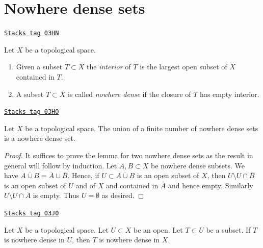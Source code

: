 \section{Nowhere dense sets}
\label{topology-section-nowhere-dense}
\begin{definition}
\label{topology-definition-nowhere-dense}
\href{https://stacks.math.columbia.edu/tag/03HN}{\texttt{Stacks tag 03HN}}

Let $X$ be a topological space.
\begin{enumerate}
\item Given a subset $T \subset X$ the {\it interior} of $T$ is the
largest open subset of $X$ contained in $T$.
\item A subset $T \subset X$ is called {\it nowhere dense} if the closure of
$T$ has empty interior.
\end{enumerate}
\end{definition}

\begin{lemma}
\label{topology-lemma-nowhere-dense}
\href{https://stacks.math.columbia.edu/tag/03HO}{\texttt{Stacks tag 03HO}}

Let $X$ be a topological space. The union of a finite number of nowhere
dense sets is a nowhere dense set.
\end{lemma}

\begin{proof}
It suffices to prove the lemma for two nowhere dense sets as the result in
general will follow by induction. Let $A,B \subset X$ be nowhere dense subsets.
We have $\overline{A \cup B} = \overline{A} \cup \overline{B}$.
Hence, if $U \subset \overline{A \cup B}$ is an open subset of $X$, then
$U \setminus U \cap \overline{B}$ is an open subset of $U$ and of $X$
and contained in $\overline{A}$ and hence empty. Similarly
$U \setminus U \cap \overline{A}$ is empty. Thus $U = \emptyset$
as desired.
\end{proof}

\begin{lemma}
\label{topology-lemma-image-nowhere-dense-open}
\href{https://stacks.math.columbia.edu/tag/03J0}{\texttt{Stacks tag 03J0}}

Let $X$ be a topological space.
Let $U \subset X$ be an open.
Let $T \subset U$ be a subset.
If $T$ is nowhere dense in $U$, then $T$ is nowhere dense in $X$.
\end{lemma}

